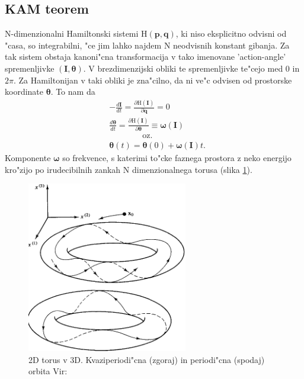 \documentclass[]{article}
\begin{document}
\subsection{KAM teorem}
N-dimenzionalni Hamiltonski sistemi $\text{H}(\boldsymbol{p},\boldsymbol{q})$, ki niso eksplicitno odvisni od "casa, so integrabilni, "ce jim lahko najdem N neodvisnih konstant gibanja. Za tak sistem obstaja kanoni"cna transformacija v tako imenovane 'action-angle' spremenljivke $(\boldsymbol{I},\boldsymbol{\theta})$. V brezdimenzijski obliki te spremenljivke te"cejo med $0$ in $2\pi$. Za Hamiltonijan v taki obliki je zna"cilno, da ni ve"c odvisen od prostorske koordinate $\boldsymbol{\theta}$. To nam da
\begin{equation}
\begin{aligned}
&-\frac{d\boldsymbol{I}}{dt}=\frac{\partial \text{H}(\boldsymbol{I})}{\partial \boldsymbol{q}}=0\\
&\frac{d \boldsymbol{\theta}}{dt}=\frac{\partial \text{H}(\boldsymbol{I})}{\partial \boldsymbol{\theta}}\equiv\boldsymbol{\omega}(\boldsymbol{I})\\
&\qquad\qquad\text{oz.}\\
&\boldsymbol{\theta}(t)=\boldsymbol{\theta}(0)+\boldsymbol{\omega}(\boldsymbol{I})t.
\end{aligned}
\end{equation}
Komponente $\boldsymbol{\omega}$ so frekvence, s katerimi to"cke faznega prostora z neko energijo kro"zijo po irudecibilnih zankah N dimenzionalnega torusa (slika \ref{slika 2}).
\begin{figure}[!htb]
	\begin{center}
		\includegraphics[width = 7cm]{torus}
		\caption{2D torus v 3D. Kvaziperiodi"cna (zgoraj) in periodi"cna (spodaj) orbita Vir: \cite{1}}
		\label{slika 2}
	\end{center}
\end{figure}
\end{document}
